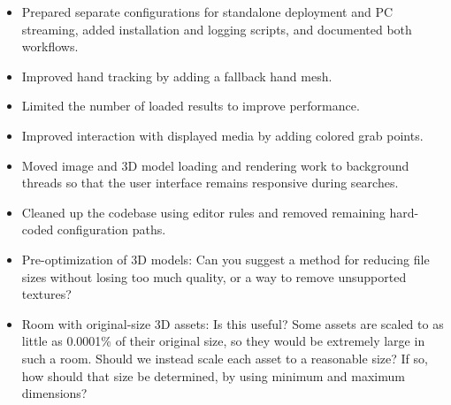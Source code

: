 \documentclass{article}
\begin{document}
\done
\begin{itemize}
    \item Prepared separate configurations for standalone deployment and PC streaming, added installation and logging scripts, and documented both workflows.
    \item Improved hand tracking by adding a fallback hand mesh.
    \item Limited the number of loaded results to improve performance.
    \item Improved interaction with displayed media by adding colored grab points.
    \item Moved image and 3D model loading and rendering work to background threads so that the user interface remains responsive during searches.
    \item Cleaned up the codebase using editor rules and removed remaining hard-coded configuration paths.
\end{itemize}

\support
\begin{itemize}
    \item Pre-optimization of 3D models: Can you suggest a method for reducing file sizes without losing too much quality, or a way to remove unsupported textures?
    \item Room with original-size 3D assets: Is this useful? Some assets are scaled to as little as 0.0001\% of their original size, so they would be extremely large in such a room. Should we instead scale each asset to a reasonable size? If so, how should that size be determined, by using minimum and maximum dimensions?
\end{itemize}

\plan
{}
\end{document}
